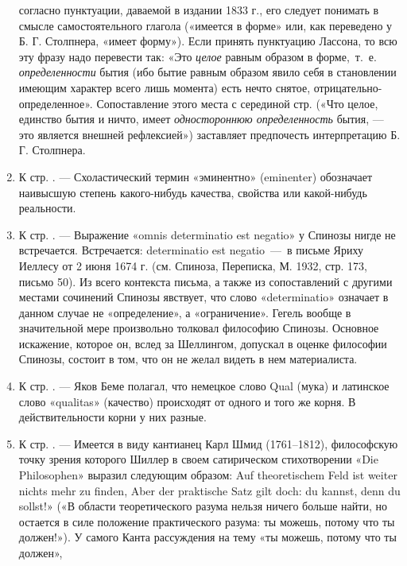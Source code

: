 \begin{enumerate}
согласно пунктуации, даваемой в издании 1833 г., его следует понимать в
смысле самостоятельного глагола («имеется в форме» или, как переведено у Б.
Г. Столпнера, «имеет форму»). Если принять пунктуацию Лассона, то всю эту
фразу надо перевести так: «Это {\em целое} равным образом в форме,~т.~е.
{\em определенности} бытия (ибо бытие равным образом явило себя в
становлении имеющим характер всего лишь момента) есть нечто снятое,
отрицательно-определенное». Сопоставление этого места с серединой
\pageref{bkm:bm25a} стр. («Что целое, единство бытия и ничто, имеет
{\em одностороннюю определенность} бытия, — это является внешней
рефлексией») заставляет предпочесть интерпретацию Б. Г. Столпнера.
\item \label{bkm:Ref474665477}К стр. \pageref{bkm:bm27}. — Схоластический
термин «эминентно» (eminenter) обозначает наивысшую степень какого-нибудь
качества, свойства или какой-нибудь реальности.
\item \label{bkm:Ref474665489}К стр. \pageref{bkm:bm28}. — Выражение «omnis
determinatio est negatio» у Спинозы нигде не встречается. Встречается:
determinatio est negatio~—~в письме Яриху Иеллесу от 2 июня 1674 г. (см.
Спиноза, Переписка, М. 1932, стр. 173, письмо 50). Из всего контекста
письма, а также из сопоставлений с другими местами сочинений Спинозы
явствует, что слово «determinatio» означает в данном случае не
«определение», а «ограничение». Гегель вообще в значительной мере
произвольно толковал философию Спинозы. Основное искажение, которое он,
вслед за Шеллингом, допускал в оценке философии Спинозы, состоит в том, что
он не желал видеть в нем материалиста.
\item \label{bkm:Ref474665496}К стр. \pageref{bkm:bm29}. — Яков Беме
полагал, что немецкое слово Qual (мука) и латинское слово «qualitas»
(качество) происходят от одного и того же корня. В действительности корни у
них разные.
\item \label{bkm:Ref474665602}К стр. \pageref{bkm:bm30}. — Имеется в виду
кантианец Карл Шмид (1761–1812), философскую точку зрения которого Шиллер в
своем сатирическом стихотворении «Die Philosophen» выразил следующим
образом:\newline
Auf theoretischem Feld ist weiter nichts mehr zu finden,\newline
Aber der praktische Satz gilt doch: du kannst, denn du sollst!»\newline
(«В области теоретического разума нельзя ничего больше найти, но остается в
силе положение практического разума: ты можешь, потому что ты должен!»). У
самого Канта рассуждения на тему «ты можешь, потому что ты должен»,

\end{enumerate}
